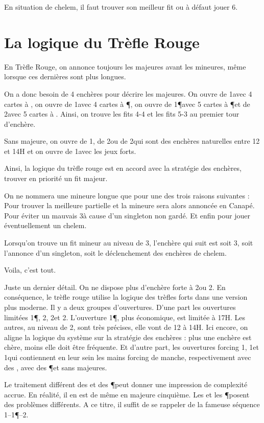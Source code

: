 En situation de chelem, il faut trouver son meilleur fit ou à défaut jouer 6\NT.

\section{La logique du Trèfle Rouge}

En Trèfle Rouge, on annonce toujours les majeures avant les mineures, même lorsque ces dernières sont plus longues.

On a donc besoin de 4 enchères pour décrire les majeures. On ouvre de 1\T avec 4 cartes à \C, on ouvre de 1\K avec 4 cartes à \P, on ouvre de 1\P avec 5 cartes à \P et de 2\C avec 5 cartes à \C. Ainsi, on trouve les fits 4-4 et les fits 5-3 au premier tour d'enchère.

Sans majeure, on ouvre de 1\NT, de 2\T ou de 2\K qui sont des enchères naturelles entre 12 et 14H et on ouvre de 1\C avec les jeux forts.

Ainsi, la logique du trèfle rouge est en accord avec la stratégie des enchères, trouver en priorité un fit majeur.

On ne nommera une mineure longue que pour une des trois raisons suivantes : Pour trouver la meilleure partielle et la mineure sera alors annoncée en Canapé. Pour éviter un mauvais 3\NT à cause d'un singleton non gardé. Et enfin pour jouer éventuellement un chelem.

Lorsqu'on trouve un fit mineur au niveau de 3, l'enchère qui suit est soit 3\NT, soit l'annonce d'un singleton, soit le déclenchement des enchères de chelem.

Voila, c’est tout.

Juste un dernier détail. On ne dispose plus d'enchère forte à 2\T ou 2\K. En conséquence, le trèfle rouge utilise la logique des trèfles forts dans une version plus moderne. Il y a deux groupes d'ouvertures. D'une part les ouvertures limitées 1\P, 2\T, 2\K et 2\C. L'ouverture 1\P, plus économique, est limitée à 17H. Les autres, au niveau de 2, sont très précises, elle vont de 12 à 14H. Ici encore, on aligne la logique du  système sur la stratégie des enchères : plus une enchère est chère, moins elle doit être fréquente. Et d'autre part, les ouvertures forcing 1\T, 1\K et 1\C qui contiennent en leur sein les mains forcing de manche, respectivement avec des \C, avec des \P et sans majeures.

Le traitement différent des \C et des \P peut donner une impression de complexité accrue. En réalité, il en est de même en majeure cinquième. Les \C et les \P posent des problèmes différents. A ce titre, il suffit de se rappeler de la fameuse séquence 1\C--1\P--2\C.

